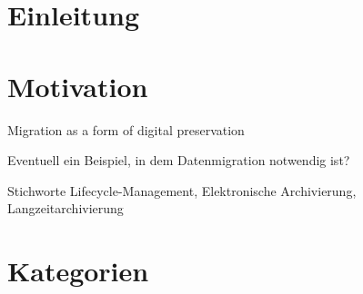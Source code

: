 \documentclass[11pt]{scrartcl}
\newif\iffull
\begin{document}
	
\iffull
\title{Data Migration} 

\subtitle{Untertitel}

\author{Julian Schenkemeyer, Tobias Fechner\\
	{\texttt{\{5Schenke,1fechner\}@informatik.uni-hamburg.de}}}

\date{Modul Software Reengineering 2015/2016\\
  \small Fachbereich Informatik\\ 
  Arbeitsbereich Softwarekonstruktion \& Werkzeuge\\ 
  Universit"at Hamburg\\[4mm]
  \today}

\maketitle

\begin{abstract}
	\small\noindent\textbf{Abstract}

	\noindent Abstract 
\end{abstract}

\newpage
\tableofcontents
\newpage

\fi



\section{Einleitung}

\section{Motivation}

Migration as a form of digital preservation

Eventuell ein Beispiel, in dem Datenmigration notwendig ist?

Stichworte Lifecycle-Management, Elektronische Archivierung, Langzeitarchivierung

\section{Kategorien}
\end{document}
